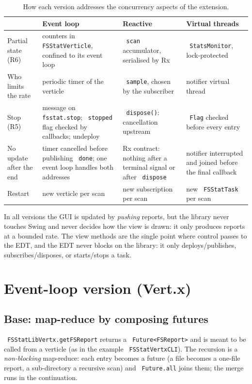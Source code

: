 \documentclass[11pt,a4paper]{article}
\newcommand{\code}[1]{\texttt{\hyphenchar\font=-1 #1}}
\begin{document}
\begin{table}[H]
\centering\small
\begin{tabularx}{\textwidth}{@{}lYYY@{}}
\toprule
 & \textbf{Event loop} & \textbf{Reactive} & \textbf{Virtual threads} \\
\midrule
Partial state (R6) & counters in \code{FSStatVerticle}, confined to its event loop &
  \code{scan} accumulator, serialised by Rx & \code{StatsMonitor}, lock-protected \\
Who limits the rate & periodic timer of the verticle & \code{sample}, chosen by the subscriber & notifier virtual thread \\
Stop (R5) & message on \code{fsstat.stop}; \code{stopped} flag checked by callbacks; undeploy &
  \code{dispose()}: cancellation upstream & \code{Flag} checked before every entry \\
No update after the end & timer cancelled before publishing \code{done}; one event loop handles both addresses &
  Rx contract: nothing after a terminal signal or after \code{dispose} & notifier interrupted and joined before the final callback \\
Restart & new verticle per scan & new subscription per scan & new \code{FSStat\-Task} per scan \\
\bottomrule
\end{tabularx}
\caption{How each version addresses the concurrency aspects of the extension.}\label{tab:cross}
\end{table}

In all versions the GUI is updated by \emph{pushing} reports, but the library never touches Swing and
never decides how the view is drawn: it only produces reports at a bounded rate. The view methods are
the single point where control passes to the EDT, and the EDT never blocks on the library: it only
deploys/publishes, subscribes/disposes, or starts/stops a task.

\section{Event-loop version (Vert.x)}

\subsection{Base: map-reduce by composing futures}

\code{FSStatLibVertx.getFSReport} returns a \code{Future<FSReport>} and is meant to be called from a
verticle (as in the example \code{FSStatVertxCLI}). The recursion is a \emph{non-blocking}
map-reduce: each entry becomes a future (a file becomes a one-file report, a sub-directory a
recursive scan) and \code{Future.all} joins them; the merge runs in the continuation.
\end{document}
